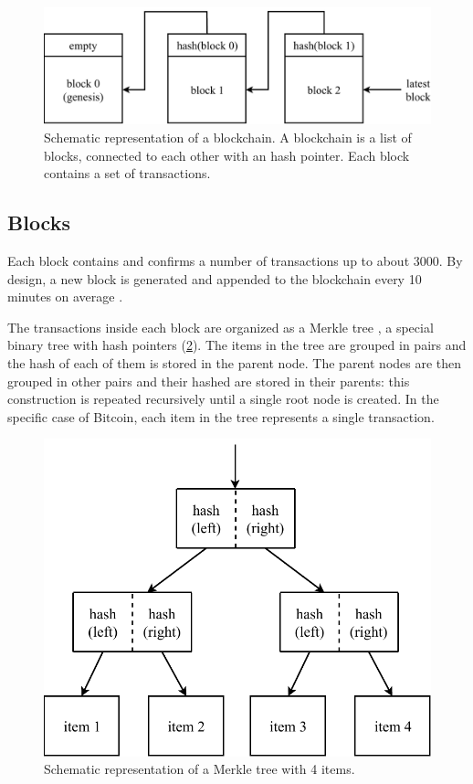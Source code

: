 \begin{figure}[h]
	\centering
	\vspace*{0.25cm}
	\includegraphics[scale=0.7]{figures/blockchain}
	\vspace*{0.25cm}
	\caption{Schematic representation of a blockchain. A blockchain is a list of blocks, connected to each other with an hash pointer. Each block contains a set of transactions.}
	\label{fig:blockchain}
\end{figure}


\subsection{Blocks}
Each block contains and confirms a number of transactions up to about \num{3000}.
By design, a new block is generated and appended to the blockchain every \num{10} minutes on average \cite{bitcoin_2008}.

The transactions inside each block are organized as a Merkle tree \cite{merkle_tree_1980}, a special binary tree with hash pointers (\cref{fig:merkle}).
The items in the tree are grouped in pairs and the hash of each of them is stored in the parent node.
The parent nodes are then grouped in other pairs and their hashed are stored in their parents:
this construction is repeated recursively until a single root node is created.
In the specific case of Bitcoin, each item in the tree represents a single transaction.

\begin{figure}[h]
	\centering
	\vspace*{0.1cm}
	\includegraphics[scale=0.7]{figures/merkle}
	\vspace*{0.25cm}
	\caption{Schematic representation of a Merkle tree with \num{4} items.}
	\label{fig:merkle}
\end{figure}

